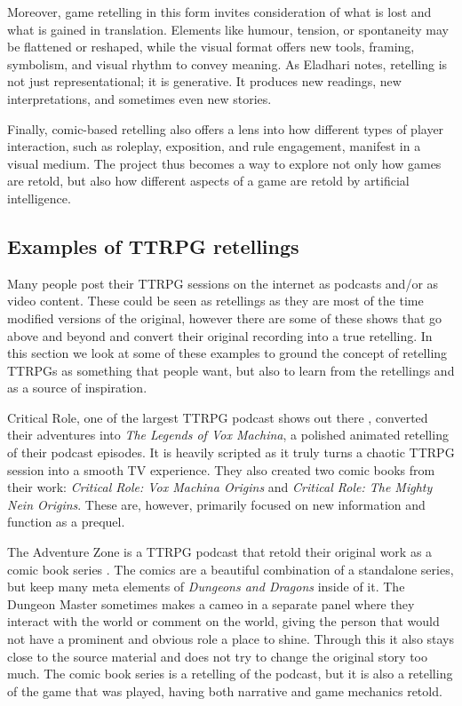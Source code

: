Moreover, game retelling in this form invites consideration of what is lost and what is gained in translation. Elements like humour, tension, or spontaneity may be flattened or reshaped, while the visual format offers new tools, framing, symbolism, and visual rhythm to convey meaning. As Eladhari notes, retelling is not just representational; it is generative. It produces new readings, new interpretations, and sometimes even new stories.

Finally, comic-based retelling also offers a lens into how different types of player interaction, such as roleplay, exposition, and rule engagement, manifest in a visual medium. The project thus becomes a way to explore not only how games are retold, but also how different aspects of a game are retold by artificial intelligence.

\subsection{Examples of TTRPG retellings}
Many people post their TTRPG sessions on the internet as podcasts and/or as video content. These could be seen as retellings as they are most of the time modified versions of the original, however there are some of these shows that go above and beyond and convert their original recording into a true retelling. In this section we look at some of these examples to ground the concept of retelling TTRPGs as something that people want, but also to learn from the retellings and as a source of inspiration.

Critical Role, one of the largest TTRPG podcast shows out there \cite{criticalrole_liveplay}, converted their adventures into \textit{The Legends of Vox Machina}\cite{criticalrole_legends_vox_machina}, a polished animated retelling of their podcast episodes. It is heavily scripted as it truly turns a chaotic TTRPG session into a smooth TV experience. They also created two comic books from their work: \textit{Critical Role: Vox Machina Origins}\cite{criticalrole_vox_machina_origins} and \textit{Critical Role: The Mighty Nein Origins}\cite{criticalrole_mighty_nein_origins}. These are, however, primarily focused on new information and function as a prequel.

The Adventure Zone is a TTRPG podcast \cite{adventurezone_podcast} that retold their original work as a comic book series \cite{AdventureZone2018}. The comics are a beautiful combination of a standalone series, but keep many meta elements of \textit{Dungeons and Dragons} inside of it. The Dungeon Master sometimes makes a cameo in a separate panel where they interact with the world or comment on the world, giving the person that would not have a prominent and obvious role a place to shine. Through this it also stays close to the source material and does not try to change the original story too much. The comic book series is a retelling of the podcast, but it is also a retelling of the game that was played, having both narrative and game mechanics retold.

